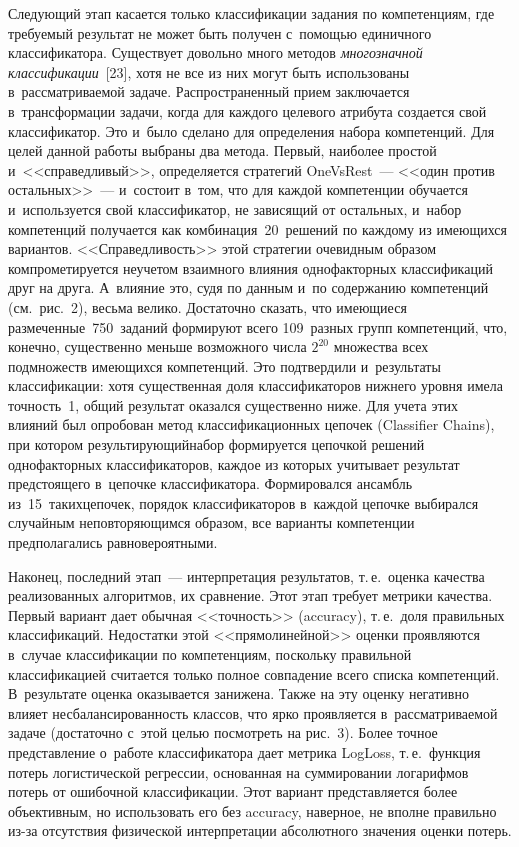 \begin{multicols}{2}
      Следующий этап касается только классификации задания по 
компетенциям, где требуемый результат не может быть получен с~помощью 
единичного классификатора. Существует довольно много методов 
\textit{многозначной классификации}~[23], хотя не все из них могут быть 
использованы в~рассматриваемой задаче. Распространенный прием 
заключается в~трансформации задачи, когда для каждого целевого атрибута 
создается свой классификатор. Это и~было сделано для определения набора 
компетенций. Для целей данной работы выбраны два метода. Первый, 
наиболее простой и~<<справедливый>>, определяется стратегий  
OneVsRest~--- <<один против остальных>>~--- и~состоит в~том, что для 
каждой компетенции обучается и~используется свой классификатор, не 
зависящий от остальных, и~набор компетенций получается как 
комбинация~20~решений по каждому из имеющихся вариантов. 
<<Справедливость>> этой стратегии очевидным образом компрометируется 
неучетом взаимного влияния однофакторных классификаций друг на друга. 
А~влияние это, судя по данным и~по содержанию компетенций (см.\ рис.~2), 
весьма велико. Достаточно сказать, что имеющиеся 
размеченные~750~заданий формируют всего 109~разных групп 
компетенций, что, конечно, существенно меньше возможного числа $2^{20}$ 
множества всех подмножеств имеющихся компетенций. Это подтвердили 
и~результаты классификации: хотя существенная доля классификаторов 
нижнего уровня имела точ\-ность~1, общий результат оказался существенно 
ниже. Для учета этих влияний был опробован метод классификационных 
цепочек (Classifier Chains), при котором результирующий\linebreak набор формируется 
цепочкой решений однофакторных классификаторов, каждое из которых 
учитывает результат предстоящего в~цепочке классификатора. Формировался 
ансамбль из~15~таких\linebreak \mbox{цепочек}, порядок классификаторов в~каждой цепочке 
выбирался случайным неповторяющимся образом, все варианты 
компетенции предполагались равновероятными.
      
      Наконец, последний этап~--- интерпретация результатов, т.\,е.\ оценка 
качества реализованных \mbox{алгоритмов}, их сравнение. Этот этап требует 
мет\-ри\-ки качества. Первый вариант дает обычная <<точ\-ность>> (accuracy), 
т.\,е.\ доля правильных классификаций. Недостатки этой 
<<прямолинейной>> оценки проявляются в~случае классификации по 
компетенциям, поскольку правильной классификацией считается только 
полное совпадение всего списка компетенций. В~результате оценка 
оказывается занижена. Так\-же на эту оценку негативно влияет 
несбалансированность классов, что ярко проявляется в~рассматриваемой 
задаче (достаточно с~этой целью посмотреть на рис.~3). Более точное 
представление о~работе классификатора дает мет\-ри\-ка LogLoss, т.\,е.\ функция 
потерь логистической регрессии, основанная на суммировании логарифмов 
потерь от ошибочной классификации. Этот вариант представляется более 
объективным, но использовать его без accuracy, наверное, не вполне 
правильно из-за отсутствия физической интерпретации абсолютного 
значения оценки потерь.
      

\end{multicols}
